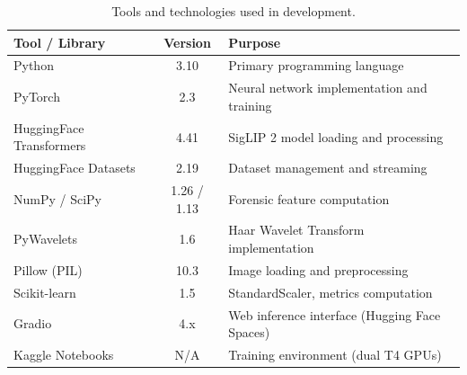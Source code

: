 \begin{table}[htbp]
    \centering
    \caption{Tools and technologies used in development.}
    \label{tab:tools}
    \begin{tabular}{p{4.5cm} c p{6.5cm}}
        \toprule
        \textbf{Tool / Library} & \textbf{Version} & \textbf{Purpose} \\
        \midrule
        Python                    & 3.10         & Primary programming language \\
        PyTorch                   & 2.3          & Neural network implementation and training \\
        HuggingFace Transformers  & 4.41         & SigLIP 2 model loading and processing \\
        HuggingFace Datasets      & 2.19         & Dataset management and streaming \\
        NumPy / SciPy             & 1.26 / 1.13  & Forensic feature computation \\
        PyWavelets                & 1.6          & Haar Wavelet Transform implementation \\
        Pillow (PIL)              & 10.3         & Image loading and preprocessing \\
        Scikit-learn              & 1.5          & StandardScaler, metrics computation \\
        Gradio                    & 4.x          & Web inference interface (Hugging Face Spaces) \\
        Kaggle Notebooks          & N/A          & Training environment (dual T4 GPUs) \\
        \bottomrule
    \end{tabular}
\end{table}
